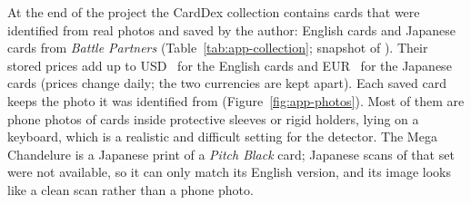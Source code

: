 At the end of the project the CardDex collection contains  cards that were identified from real photos and saved by the author:  English cards and  Japanese cards from \emph{Battle Partners} (Table~\ref{tab:app-collection}; snapshot of ). Their stored prices add up to USD~ for the English cards and EUR~ for the Japanese cards (prices change daily; the two currencies are kept apart). Each saved card keeps the photo it was identified from (Figure~\ref{fig:app-photos}). Most of them are phone photos of cards inside protective sleeves or rigid holders, lying on a keyboard, which is a realistic and difficult setting for the detector. The Mega Chandelure is a Japanese print of a \emph{Pitch Black} card; Japanese scans of that set were not available, so it can only match its English version, and its image looks like a clean scan rather than a phone photo.




